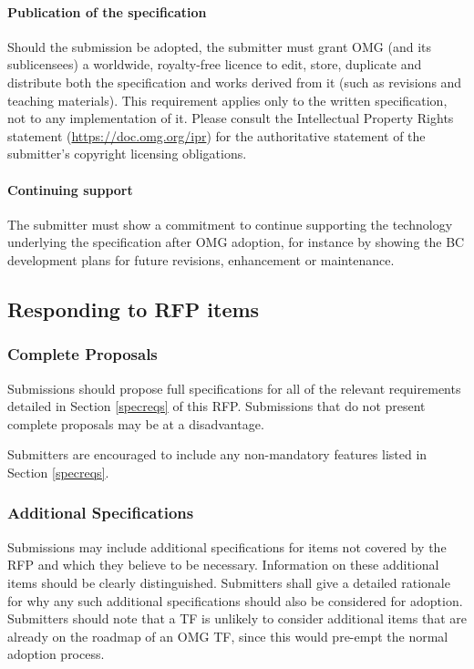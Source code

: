 \paragraph{Publication of the specification}

Should the submission be adopted, the submitter must grant OMG (and its sublicensees) a worldwide, royalty-free licence to edit, store, duplicate and distribute both the specification and works derived from it (such as revisions and teaching materials). This requirement applies only to the written specification, not to any implementation of it. Please consult the Intellectual Property Rights statement (\url{https://doc.omg.org/ipr}) for the authoritative statement of the submitter's copyright licensing obligations.


\paragraph{Continuing support}

The submitter must show a commitment to continue supporting the technology underlying the specification after OMG adoption, for instance by showing the BC development plans for future revisions, enhancement or maintenance.


\subsection{Responding to RFP items}
\subsubsection{Complete Proposals}

Submissions should propose full specifications for all of the relevant requirements detailed in Section \ref{specreqs} of this RFP. Submissions that do not present complete proposals may be at a disadvantage.

Submitters are encouraged to include any non-mandatory features listed in Section \ref{specreqs}.


\subsubsection{Additional Specifications}

Submissions may include additional specifications for items not covered by the RFP and which they believe to be necessary. Information on these additional items should be clearly distinguished. Submitters shall give a detailed rationale for why any such additional specifications should also be considered for adoption. Submitters should note that a TF is unlikely to consider additional items that are already on the roadmap of an OMG TF, since this would pre-empt the normal adoption process.



